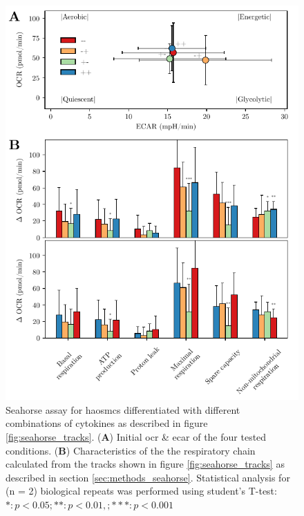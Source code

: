     \begin{figure}[h!]
    \capstart
        \centering
    	\includegraphics{Abbildung/Seahorse_summary_merged.pdf}

    	\begin{minipage}{\captionwidth}
    		\caption[energy_profile]{ \newline Seahorse assay for \acp{haosmc} differentiated with different combinations of cytokines as described in figure \ref{fig:seahorse_tracks}.
            (\textbf{A}) Initial \ac{ocr} \& \ac{ecar} of the four tested conditions. (\textbf{B}) Characteristics of the the respiratory chain calculated from the tracks shown in figure \ref{fig:seahorse_tracks} as described in section \ref{sec:methods_seahorse}. Statistical analysis for (n = 2) biological repeats was performed using student's T-test: $*: p < 0.05; **: p < 0.01, ; ***: p < 0.001$}
    		\label{fig:energy_profile}
    	\end{minipage}
    \end{figure}

